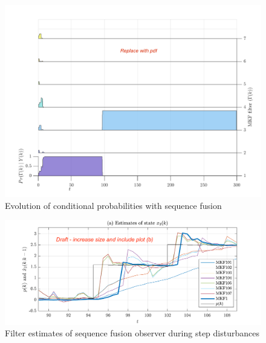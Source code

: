 \begin{figure}[htp]
	\centering
	\includegraphics[width=15cm]{images/rod-obs-sim-1-4-wfplot-DRAFT.png}
	\caption{Evolution of conditional probabilities with sequence fusion}
	\label{fig:rod-obs-sim-1-4-wfplot}
\end{figure}

\begin{figure}[htp]
	\centering
	\includegraphics[width=14cm]{images/rod-obs-sim-1-4-est-MKF-SF-plot-DRAFT.pdf}
	\caption{Filter estimates of sequence fusion observer during step disturbances}
	\label{fig:rod-obs-sim-1-4-est-MKF-SF-plot-DRAFT}
\end{figure}

